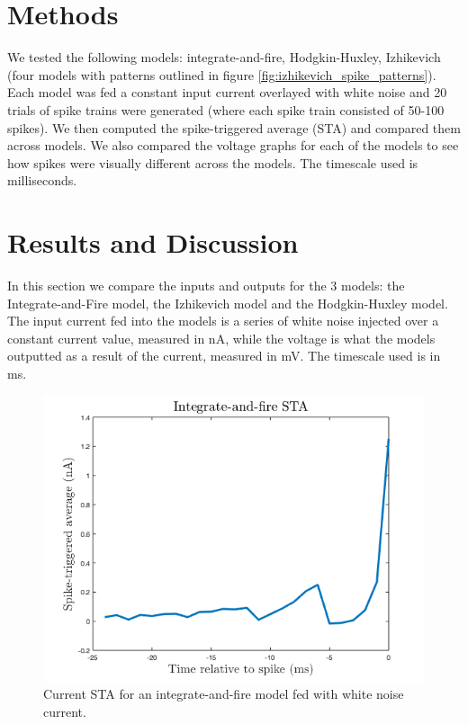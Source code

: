 \documentclass[11pt]{article}
\begin{document}
\section{Methods}
\label{sec:methods}
We tested the following models: integrate-and-fire, Hodgkin-Huxley, Izhikevich (four models with patterns outlined in figure \ref{fig:izhikevich_spike_patterns}). Each model was fed a constant input current overlayed with white noise and 20 trials of spike trains were generated (where each spike train consisted of 50-100 spikes). We then computed the spike-triggered average (STA) and compared them across models. We also compared the voltage graphs for each of the models to see how spikes were visually different across the models. The timescale used is milliseconds.

\section{Results and Discussion}
\label{sec:results}
In this section we compare the inputs and outputs for the 3 models: the Integrate-and-Fire model, the Izhikevich model and the Hodgkin-Huxley model. The input current fed into the models is a series of white noise injected over a constant current value, measured in nA, while the voltage is what the models outputted as a result of the current, measured in mV. The timescale used is in ms.

\begin{figure}[H]
    \centering
    \includegraphics[width=5in]{figures/intfire_sta.png}
    \caption{Current STA for an integrate-and-fire model fed with white noise current.}
    \label{fig:intfire_sta}
\end{figure}
\end{document}
